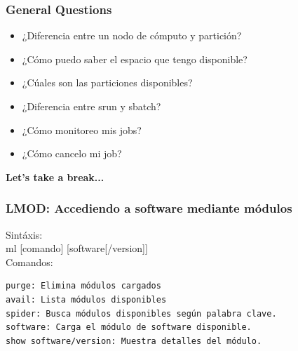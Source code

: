 \documentclass[aspectratio=169,professionalfonts]{beamer}
\begin{document}
\begin{frame}[fragile]
\frametitle{\textbf{General Questions}}
\begin{itemize}
    \item ¿Diferencia entre un nodo de cómputo y partición?
     \vspace{0.5em} 
    \item ¿Cómo puedo saber el espacio que tengo disponible?
     \vspace{0.5em} 
    \item ¿Cúales son las particiones disponibles?
     \vspace{0.5em} 
    \item ¿Diferencia entre srun y sbatch?
     \vspace{0.5em} 
    \item ¿Cómo monitoreo mis jobs?
     \vspace{0.5em} 
    \item ¿Cómo cancelo mi job?
\end{itemize}
    
\end{frame}

\begin{frame}[fragile]

\vspace{0.5em} 
\textbf{Let's take a break...}
    
\end{frame}


\begin{frame}[fragile]
\frametitle{\textbf{LMOD: Accediendo a software mediante módulos}}
  Sintáxis: \\ 
  ml [comando]  [software[/version]] \\ 
  Comandos: \\ 

\begin{verbatim}
purge: Elimina módulos cargados  
avail: Lista módulos disponibles  
spider: Busca módulos disponibles según palabra clave.
software: Carga el módulo de software disponible. 
show software/version: Muestra detalles del módulo.
\end{verbatim}

\end{frame}
\end{document}
